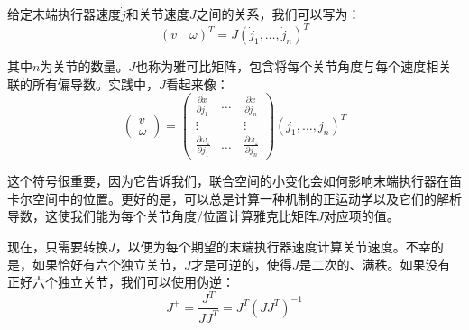 给定末端执行器速度$\dot{j}$和关节速度$J$之间的关系，我们可以写为：
\begin{equation}
 (v \quad \omega)^T=J(\dot{j}_1,\ldots,\dot{j}_n)^T
\end{equation}


其中$n$为关节的数量。$J$也称为雅可比矩阵，包含将每个关节角度与每个速度相关联的所有偏导数。实践中，$J$看起来像：
\begin{equation}
\left(\begin{array}{c}v\\\omega\end{array}\right)=\left(\begin{array}{ccc}\frac{\partial{x}}{\partial{j_1}} & \ldots & \frac{\partial{x}}{\partial{j_n}}\\\vdots & \quad & \vdots\\\frac{\partial{\omega_z}}{\partial{j_1}} & \ldots & \frac{\partial{\omega_z}}{\partial{j_n}}\end{array}\right)(j_1,\ldots,j_n)^T
\end{equation}


这个符号很重要，因为它告诉我们，联合空间的小变化会如何影响末端执行器在笛卡尔空间中的位置。更好的是，可以总是计算一种机制的正运动学以及它们的解析导数，这使我们能为每个关节角度/位置计算雅克比矩阵$J$对应项的值。


现在，只需要转换$J$，以便为每个期望的末端执行器速度计算关节速度。不幸的是，如果恰好有六个独立关节，$J$才是可逆的，使得$J$是二次的、满秩。如果没有正好六个独立关节，我们可以使用伪逆：
\begin{equation}
J^+=\frac{J^T}{JJ^T}=J^T(JJ^T)^{-1}
\end{equation}


